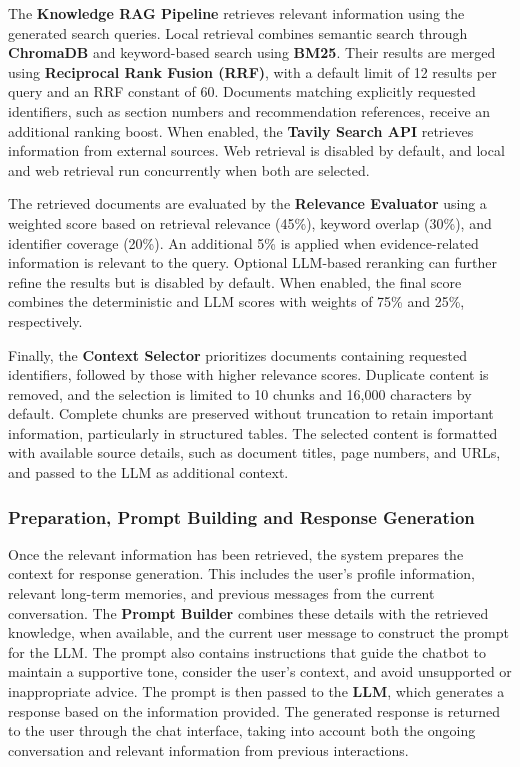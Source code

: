 \documentclass[conference]{IEEEtran}
\begin{document}
The \textbf{Knowledge RAG Pipeline} retrieves relevant information using the generated search queries. Local retrieval combines semantic search through \textbf{ChromaDB} and keyword-based search using \textbf{BM25}. Their results are merged using \textbf{Reciprocal Rank Fusion (RRF)}, with a default limit of 12 results per query and an RRF constant of 60. Documents matching explicitly requested identifiers, such as section numbers and recommendation references, receive an additional ranking boost. When enabled, the \textbf{Tavily Search API} retrieves information from external sources. Web retrieval is disabled by default, and local and web retrieval run concurrently when both are selected.

The retrieved documents are evaluated by the \textbf{Relevance Evaluator} using a weighted score based on retrieval relevance (45\%), keyword overlap (30\%), and identifier coverage (20\%). An additional 5\% is applied when evidence-related information is relevant to the query. Optional LLM-based reranking can further refine the results but is disabled by default. When enabled, the final score combines the deterministic and LLM scores with weights of 75\% and 25\%, respectively.

Finally, the \textbf{Context Selector} prioritizes documents containing requested identifiers, followed by those with higher relevance scores. Duplicate content is removed, and the selection is limited to 10 chunks and 16,000 characters by default. Complete chunks are preserved without truncation to retain important information, particularly in structured tables. The selected content is formatted with available source details, such as document titles, page numbers, and URLs, and passed to the LLM as additional context.

\subsubsection{Preparation, Prompt Building and Response Generation}
Once the relevant information has been retrieved, the system prepares the context for response generation. This includes the user's profile information, relevant long-term memories, and previous messages from the current conversation. The \textbf{Prompt Builder} combines these details with the retrieved knowledge, when available, and the current user message to construct the prompt for the LLM. The prompt also contains instructions that guide the chatbot to maintain a supportive tone, consider the user's context, and avoid unsupported or inappropriate advice. The prompt is then passed to the \textbf{LLM}, which generates a response based on the information provided. The generated response is returned to the user through the chat interface, taking into account both the ongoing conversation and relevant information from previous interactions.
\end{document}
